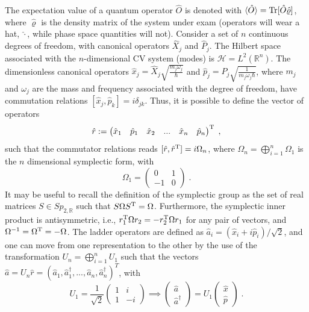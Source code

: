 \documentclass[%
reprint,
superscriptaddress,
nofootinbib,
 amsmath,amssymb,
prx,
floatfix,
]{revtex4-2}
\begin{document}
The expectation value of a quantum operator $\hat{O}$ is denoted with $\braket{\hat{O}} = \text{Tr} [ \hat{O} \hat{\varrho} ]$, where $\hat{\varrho} $ is the  density matrix of the system under exam (operators will wear a hat, $\hat{\cdot}$, while phase space quantities will not). Consider a set of $n$ continuous degrees of freedom, with canonical operators $\hat{X}_j$ and $\hat{P}_j$. The Hilbert space associated with the $n$-dimensional CV system (modes) is $\mathcal{H} = L^2 (\mathds{R}^n)$. The dimensionless canonical operators $\hat{x}_j=\hat{X}_{j}\sqrt{\frac{m_j\omega_j}{\hbar}}$ and $\hat{p}_j=\hat{P}_{j}\sqrt{\frac{1}{m_j\omega_j\hbar}}$, where $m_j$ and $\omega_j$ are the mass and frequency associated with the degree of freedom, have commutation relations $[\hat{x}_j, \hat{p}_k] = i\delta_{jk}$.  Thus, it is possible to define the vector of operators
\begin{equation}
\label{eq:def_first_second}
    \hat{r} := \begin{pmatrix}
        \hat{x}_1 &
        \hat{p}_1 &
        \hat{x}_2 & 
        ... &
        \hat{x}_n &
        \hat{p}_n 
    \end{pmatrix}^{\rm T} \; , 
\end{equation}
such that the commutator relations reads $[ \hat{r}, \hat{r}^{\rm T} ] = i \Omega_n $, where  $\Omega_n = \bigoplus_{i = 1}^n \Omega_1$ is the $n$ dimensional symplectic form, with
\begin{equation}
    \Omega_1 = \begin{pmatrix}
        0 & 1 \\
        -1 & 0
    \end{pmatrix} \;.
\end{equation}
It may be useful to recall the definition of the symplectic group as the set of real matrices $S \in Sp_{2, \mathds{R}}$ such that $S \Omega S^{\rm T} = \Omega$. Furthermore, the symplectic inner product is antisymmetric, i.e., $r_1^{\rm T} \Omega r_2 = - r_2^{\rm T} \Omega r_1 $ for any pair of vectors, and $\Omega^{-1} = \Omega^{\rm T} = - \Omega$. The ladder operators are defined as $\hat{a}_i = (\hat{x}_i + i \hat{p}_i)/ \sqrt{2}$, and one can move from one representation to the other by the use of the transformation $U_n = \bigoplus_{i = 1}^n U_1$ such that the vectors  $\hat{a} = U_n \hat{r} = (\hat{a}_1, \hat{a}_1^\dag, ... , \hat{a}_n, \hat{a}_n^\dag)^{T}$, with
\begin{equation}
\label{eq:change_basis}
    U_1 = \frac{1}{\sqrt{2}}
   \begin{pmatrix}
        1 & i \\
        1 & -i
    \end{pmatrix}   \implies  \begin{pmatrix}
        \hat{a} \\
        \hat{a}^\dag
    \end{pmatrix} = U_1 \begin{pmatrix}
        \hat{x} \\
        \hat{p}
    \end{pmatrix}\;.
\end{equation}
\end{document}
